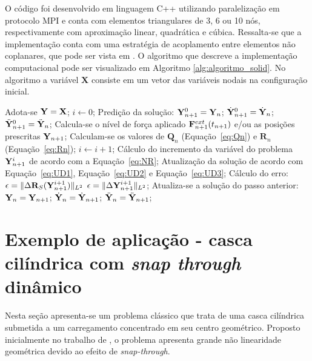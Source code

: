 O código foi desenvolvido em linguagem C++ utilizando paralelização em protocolo MPI e conta com elementos triangulares de 3, 6 ou 10 nós, respectivamente com aproximação linear, quadrática e cúbica. Ressalta-se que a implementação conta com uma estratégia de acoplamento entre elementos não coplanares, que pode ser vista em . O algoritmo que descreve a implementação computacional pode ser visualizado em Algoritmo \ref{alg:algoritmo_solid}. No algoritmo a variável $\mathbf{X}$ consiste em um vetor das variáveis nodais na configuração inicial.

\begin{algorithm}[!htbp]
	\caption{Algoritmo para problemas não lineares dinâmicos utilizando MEF posicional}
	\label{alg:algoritmo_solid}
	\begin{algorithmic}[1]
		\State Adota-se $\mathbf{Y} = \mathbf{X}$;
		\State $i \gets 0$;
		\State Predição da solução:
		\State $\mathbf{Y}_{n+1}^{0} = \mathbf{Y}_{n}$;
		\State $\dot{\mathbf{Y}}_{n+1}^{0} = \dot{\mathbf{Y}}_{n}$;
		\State $\ddot{\mathbf{Y}}_{n+1}^{0} = \ddot{\mathbf{Y}}_{n}$;
		\State Calcula-se o nível de força aplicado $\mathbf{F}^{ext}_{n+1}(t_{n+1})$ e/ou as posições prescritas $\mathbf{Y}_{n+1}$;
		\State Calculam-se os valores de $\mathbf{Q}_n$ (Equação~\eqref{eq:Qn}) e $\mathbf{R}_n$ (Equação~\eqref{eq:Rn});
		\State $i \gets i + 1$;
		\State Cálculo do incremento da variável do problema $\mathbf{Y}_{n+1}^{i}$ de acordo com a Equação~\eqref{eq:NR};
		\State Atualização da solução de acordo com Equação~\eqref{eq:UD1}, Equação~\eqref{eq:UD2} e Equação~\eqref{eq:UD3};
		\State Cálculo do erro:
		\State $\epsilon = \lVert \Delta\mathbf{R}_S(\mathbf{Y}_{n+1}^{i+1}) \rVert_{L^2}$  $\epsilon = \lVert \Delta\mathbf{Y}_{n+1}^{i+1} \rVert_{L^2}$;
		\EndWhile
		\State Atualiza-se a solução do passo anterior:
		\State $\mathbf{Y}_{n} = \mathbf{Y}_{n+1}$;
		\State $\dot{\mathbf{Y}}_{n} = \dot{\mathbf{Y}}_{n+1}$;
		\State $\ddot{\mathbf{Y}}_{n} = \ddot{\mathbf{Y}}_{n+1}$;
		\EndFor
	\end{algorithmic}
\end{algorithm}

\section{Exemplo de aplicação - casca cilíndrica com \textit{snap through} dinâmico}

Nesta seção apresenta-se um problema clássico que trata de uma casca cilíndrica submetida a um carregamento concentrado em seu centro geométrico. Proposto inicialmente no trabalho de 
, o problema apresenta grande não linearidade geométrica devido ao efeito de \textit{snap-through}. 

